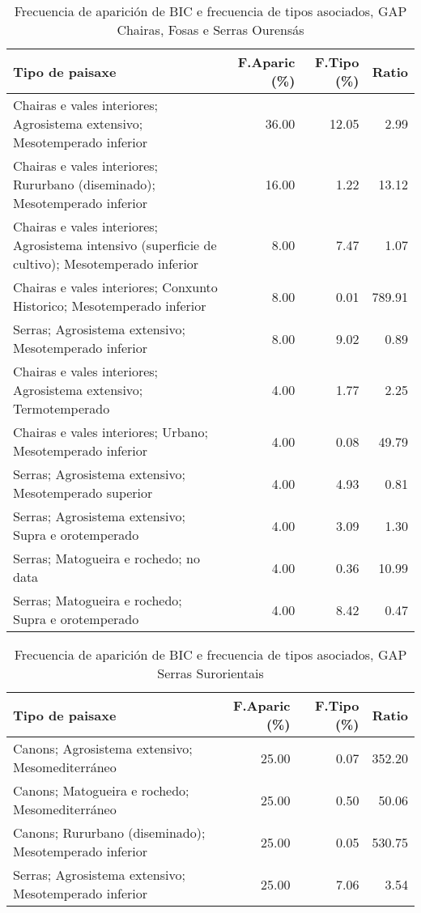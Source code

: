 \begin{table}[p]
\centering
\caption{Frecuencia de aparición de BIC e frecuencia de tipos asociados, GAP Chairas, Fosas e Serras Ourensás} 
\label{vbic8}
\begin{tabular}{lrrr}
  \hline
Tipo de paisaxe & F.Aparic (\%) & F.Tipo (\%) & Ratio \\ 
  \hline
Chairas e vales interiores; Agrosistema extensivo; Mesotemperado inferior & 36.00 & 12.05 & 2.99 \\ 
  Chairas e vales interiores; Rururbano (diseminado); Mesotemperado inferior & 16.00 & 1.22 & 13.12 \\ 
  Chairas e vales interiores; Agrosistema intensivo (superficie de cultivo); Mesotemperado inferior & 8.00 & 7.47 & 1.07 \\ 
  Chairas e vales interiores; Conxunto Historico; Mesotemperado inferior & 8.00 & 0.01 & 789.91 \\ 
  Serras; Agrosistema extensivo; Mesotemperado inferior & 8.00 & 9.02 & 0.89 \\ 
  Chairas e vales interiores; Agrosistema extensivo; Termotemperado & 4.00 & 1.77 & 2.25 \\ 
  Chairas e vales interiores; Urbano; Mesotemperado inferior & 4.00 & 0.08 & 49.79 \\ 
  Serras; Agrosistema extensivo; Mesotemperado superior & 4.00 & 4.93 & 0.81 \\ 
  Serras; Agrosistema extensivo; Supra e orotemperado & 4.00 & 3.09 & 1.30 \\ 
  Serras; Matogueira e rochedo; no data & 4.00 & 0.36 & 10.99 \\ 
  Serras; Matogueira e rochedo; Supra e orotemperado & 4.00 & 8.42 & 0.47 \\ 
   \hline
\end{tabular}
\end{table}
\begin{table}[p]
\centering
\caption{Frecuencia de aparición de BIC e frecuencia de tipos asociados, GAP Serras Surorientais} 
\label{vbic9}
\begin{tabular}{lrrr}
  \hline
Tipo de paisaxe & F.Aparic (\%) & F.Tipo (\%) & Ratio \\ 
  \hline
Canons; Agrosistema extensivo; Mesomediterráneo & 25.00 & 0.07 & 352.20 \\ 
  Canons; Matogueira e rochedo; Mesomediterráneo & 25.00 & 0.50 & 50.06 \\ 
  Canons; Rururbano (diseminado); Mesotemperado inferior & 25.00 & 0.05 & 530.75 \\ 
  Serras; Agrosistema extensivo; Mesotemperado inferior & 25.00 & 7.06 & 3.54 \\ 
   \hline
\end{tabular}
\end{table}
